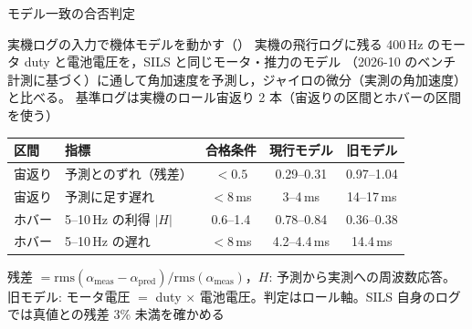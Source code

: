 \begin{frame}{モデル一致の合否判定}
  \begin{block}{実機ログの入力で機体モデルを動かす（）}\footnotesize
    実機の飛行ログに残る 400\,Hz のモータ duty と電池電圧を，SILS と同じモータ・推力のモデル
    （2026-10 のベンチ計測に基づく）に通して角加速度を予測し，ジャイロの微分（実測の角加速度）と比べる。
    基準ログは実機のロール宙返り 2 本（宙返りの区間とホバーの区間を使う）
  \end{block}

  \vspace{0.2em}

  \begin{table}
    \centering\scriptsize
    \begin{tabular}{llccc}
      \hline
      \textbf{区間} & \textbf{指標} & \textbf{合格条件} & \textbf{現行モデル} & \textbf{旧モデル} \\
      \hline
      宙返り & 予測とのずれ（残差） & $<0.5$ & 0.29--0.31 & 0.97--1.04 \\
      宙返り & 予測に足す遅れ & $<8$\,ms & 3--4\,ms & 14--17\,ms \\
      ホバー & 5--10\,Hz の利得 $|H|$ & 0.6--1.4 & 0.78--0.84 & 0.36--0.38 \\
      ホバー & 5--10\,Hz の遅れ & $<8$\,ms & 4.2--4.4\,ms & 14.4\,ms \\
      \hline
    \end{tabular}
  \end{table}

  {\scriptsize 残差 $=\mathrm{rms}(\alpha_\mathrm{meas}-\alpha_\mathrm{pred})/\mathrm{rms}(\alpha_\mathrm{meas})$，$H$: 予測から実測への周波数応答。
  旧モデル: モータ電圧 $=$ duty $\times$ 電池電圧。判定はロール軸。SILS 自身のログでは真値との残差 3\% 未満を確かめる}
\end{frame}

